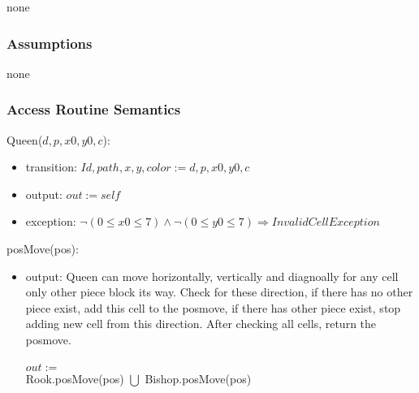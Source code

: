 \documentclass[12pt]{article}
\begin{document}
none

\subsubsection* {Assumptions}

none

\subsubsection* {Access Routine Semantics}

Queen($d, p, x0, y0, c$):
\begin{itemize}
\item transition: $Id, path, x, y, color := d, p, x0, y0, c$
\item output: $out := \mathit{self}$
\item exception: $ \neg (0 \leq x0 \leq 7) \wedge  \neg (0 \leq y0 \leq 7) \Rightarrow InvalidCellException$
\end{itemize}

\noindent posMove(pos):
\begin{itemize}
\item output: Queen can move horizontally, vertically and diagnoally for any cell only other piece block its way. Check for these direction, if there has no other piece exist, add this cell to the posmove, if there has other piece exist, stop adding new cell from this direction. After checking all cells, return the posmove.\\
\\
$out :=$\\
Rook.posMove(pos) $\bigcup$ Bishop.posMove(pos)
\end{itemize}

\newpage
\end{document}
